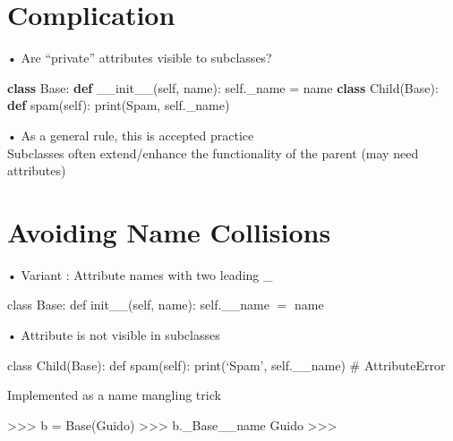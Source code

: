 \documentclass[
  letterpaper,
  DIV=11,
  numbers=noendperiod]{scrreprt}
\newenvironment{Shaded}{\begin{snugshade}}{\end{snugshade}}
\newcommand{\BuiltInTok}[1]{\textcolor[rgb]{0.00,0.23,0.31}{#1}}
\newcommand{\FunctionTok}[1]{\textcolor[rgb]{0.28,0.35,0.67}{#1}}
\newcommand{\KeywordTok}[1]{\textcolor[rgb]{0.00,0.23,0.31}{\textbf{#1}}}
\newcommand{\NormalTok}[1]{\textcolor[rgb]{0.00,0.23,0.31}{#1}}
\newcommand{\OperatorTok}[1]{\textcolor[rgb]{0.37,0.37,0.37}{#1}}
\newcommand{\StringTok}[1]{\textcolor[rgb]{0.13,0.47,0.30}{#1}}
\newcommand{\VariableTok}[1]{\textcolor[rgb]{0.07,0.07,0.07}{#1}}
\begin{document}

\chapter{Complication}\label{complication}

• Are ``private'' attributes visible to subclasses?

\begin{Shaded}
\begin{Highlighting}[]
\KeywordTok{class}\NormalTok{ Base: }\KeywordTok{def} \FunctionTok{\_\_init\_\_}\NormalTok{(}\VariableTok{self}\NormalTok{, name): }\VariableTok{self}\NormalTok{.\_name }\OperatorTok{=}\NormalTok{ name   }
\KeywordTok{class}\NormalTok{ Child(Base): }\KeywordTok{def}\NormalTok{ spam(}\VariableTok{self}\NormalTok{): }\BuiltInTok{print}\NormalTok{(}\StringTok{\textquotesingle{}Spam\textquotesingle{}}\NormalTok{, }\VariableTok{self}\NormalTok{.\_name) }
\end{Highlighting}
\end{Shaded}

• As a general rule, this is accepted practice\\
Subclasses often extend/enhance the functionality of the parent (may
need attributes)


\chapter{Avoiding Name Collisions}\label{avoiding-name-collisions}

• Variant : Attribute names with two leading \_

class Base: def init\_\_(self, name): self.\_\_name \(=\) name

• Attribute is not visible in subclasses

class Child(Base): def spam(self): print(`Spam', self.\_\_name) \#
AttributeError

Implemented as a name mangling trick

\begin{Shaded}
\begin{Highlighting}[]
\NormalTok{\textgreater{}\textgreater{}\textgreater{} b = Base(\textquotesingle{}Guido\textquotesingle{})  }
\NormalTok{\textgreater{}\textgreater{}\textgreater{} b.\_Base\_\_name  }
\NormalTok{\textquotesingle{}Guido\textquotesingle{}  }
\NormalTok{\textgreater{}\textgreater{}\textgreater{} }
\end{Highlighting}
\end{Shaded}
\end{document}

